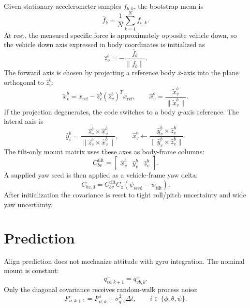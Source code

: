 \documentclass[11pt]{article}
\newcommand{\T}{^{T}}
\begin{document}
Given stationary accelerometer samples \(f_{b,k}\), the bootstrap mean is
\begin{equation}
  \bar f_b=\frac{1}{N}\sum_{k=1}^{N}f_{b,k}.
\end{equation}
At rest, the measured specific force is approximately opposite vehicle down, so
the vehicle down axis expressed in body coordinates is initialized as
\begin{equation}
  \hat z_v^b = -\frac{\bar f_b}{\|\bar f_b\|}.
\end{equation}
The forward axis is chosen by projecting a reference body \(x\)-axis into the
plane orthogonal to \(\hat z_v^b\):
\begin{equation}
  \tilde x_v^b = x_{\mathrm{ref}} -
  \hat z_v^b(\hat z_v^b)\T x_{\mathrm{ref}},
  \qquad
  \hat x_v^b=\frac{\tilde x_v^b}{\|\tilde x_v^b\|}.
\end{equation}
If the projection degenerates, the code switches to a body \(y\)-axis reference.
The lateral axis is
\begin{equation}
  \hat y_v^b =
  \frac{\hat z_v^b \times \hat x_v^b}
       {\|\hat z_v^b \times \hat x_v^b\|},
  \qquad
  \hat x_v^b \leftarrow
  \frac{\hat y_v^b \times \hat z_v^b}
       {\|\hat y_v^b \times \hat z_v^b\|}.
\end{equation}
The tilt-only mount matrix uses these axes as body-frame columns:
\begin{equation}
  C_{bv}^{\mathrm{tilt}} =
  \begin{bmatrix}
  \hat x_v^b & \hat y_v^b & \hat z_v^b
  \end{bmatrix}.
\end{equation}
A supplied yaw seed is then applied as a vehicle-frame yaw delta:
\begin{equation}
  C_{bv,0}=C_{bv}^{\mathrm{tilt}} C_z(\psi_{\mathrm{seed}}-\psi_{\mathrm{tilt}}).
\end{equation}
After initialization the covariance is reset to tight roll/pitch uncertainty
and wide yaw uncertainty.

\section{Prediction}

Align prediction does not mechanize attitude with gyro integration. The nominal
mount is constant:
\begin{equation}
  q_{vb,k+1}^{-}=q_{vb,k}^{+}.
\end{equation}
Only the diagonal covariance receives random-walk process noise:
\begin{equation}
  P_{ii,k+1}^{-}=P_{ii,k}^{+}+\sigma_{q,i}^{2}\Delta t,
  \qquad i\in\{\phi,\theta,\psi\}.
\end{equation}
\end{document}

